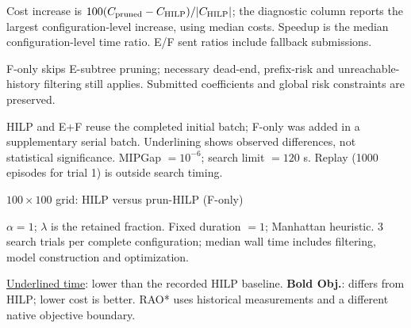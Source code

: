 \documentclass[10pt]{article}
\begin{document}
\noindent\small Cost increase is $100(C_{\rm pruned}-C_{\rm HILP})/|C_{\rm HILP}|$; the diagnostic column reports the largest configuration-level increase, using median costs. Speedup is the median configuration-level time ratio. E/F sent ratios include fallback submissions.\par
\noindent\small F-only skips E-subtree pruning; necessary dead-end, prefix-risk and unreachable-history filtering still applies. Submitted coefficients and global risk constraints are preserved.\par
\noindent\small HILP and E+F reuse the completed initial batch; F-only was added in a supplementary serial batch. Underlining shows observed differences, not statistical significance. MIPGap $=10^{-6}$; search limit $=120$ s. Replay (1000 episodes for trial 1) is outside search timing.\par
\clearpage
\begin{center}\Large $ 100\times100$ grid: HILP versus prun-HILP (F-only)\end{center}
\noindent $\alpha=1$; $\lambda$ is the retained fraction. Fixed duration $=1$; Manhattan heuristic. 3 search trials per complete configuration; median wall time includes filtering, model construction and optimization.\par
\noindent \underline{Underlined time}: lower than the recorded HILP baseline. \textbf{Bold Obj.}: differs from HILP; lower cost is better. RAO* uses historical measurements and a different native objective boundary.\par
\end{document}
